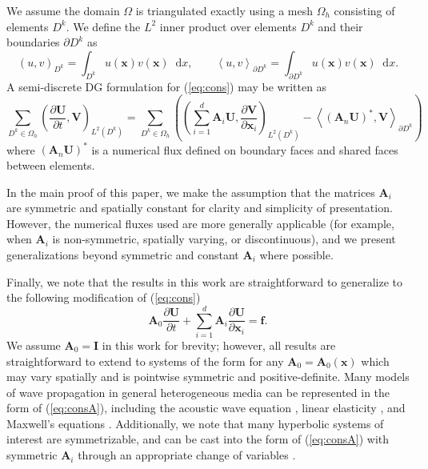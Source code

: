\documentclass[preprint,10pt]{elsarticle}
\newcommand{\pd}[2]{\frac{\partial#1}{\partial#2}}
\newcommand{\LRp}[1]{\left( #1 \right)}
\newcommand{\LRa}[1]{\left\langle #1 \right\rangle}
\newcommand{\Lk}{L^2\LRp{D^k}}
\newcommand{\Oh}{\Omega_h}
\newcommand{\note}[1]{#1}
\newcommand*\diff[1]{\mathop{}\!{\mathrm{d}#1}}
\begin{document}
We assume the domain $\Omega$ is triangulated exactly using a mesh $\Oh$ consisting of elements $D^k$.  We define the $L^2$ inner product over elements $D^k$ and their boundaries $\partial D^k$ as
\[
\LRp{u,v}_{D^k} = \int_{D^k} u(\bm{x})v(\bm{x}) \diff x, \qquad \LRa{u,v}_{\partial D^k} = \int_{\partial D^k} u(\bm{x})v(\bm{x}) \diff x.
\]
A semi-discrete DG formulation for (\ref{eq:cons}) may be written as 
\begin{equation}
\sum_{D^k \in \Oh} \LRp{\pd{\bm{U}}{t},\bm{V} }_{\Lk} = \sum_{D^k \in \Oh}\LRp{ \note{\LRp{\sum_{i=1}^d\bm{A}_i \bm{U}, \pd{\bm{V}}{\bm{x}_i}}_{\Lk}} - \LRa{(\bm{A}_n\bm{U})^*,\bm{V}}_{\partial D^k}}
\label{eq:formulation}
\end{equation}
where $(\bm{A}_n\bm{U})^*$ is a numerical flux defined on boundary faces and shared faces between elements.  

\note{
In the main proof of this paper, we make the assumption that the matrices $\bm{A}_i$ are symmetric and spatially constant for clarity and simplicity of presentation.  However, the numerical fluxes used are more generally applicable (for example, when $\bm{A}_i$ is non-symmetric, spatially varying, or discontinuous), and we present generalizations beyond symmetric and constant $\bm{A}_i$ where possible.  
}

Finally, we note that
the results in this work are straightforward to generalize to the following modification of (\ref{eq:cons})
\begin{equation}
\bm{A}_0\pd{\bm{U}}{t} + \sum_{i=1}^d \bm{A}_i\pd{{\bm{U}}}{\bm{x}_i} = \bm{f}.
\label{eq:consA}
\end{equation}
We assume $\bm{A}_0 = \bm{I}$ in this work for brevity; however, all results are straightforward to extend to systems of the form for any $\bm{A}_0 = \bm{A}_0(\bm{x})$ which may vary spatially and is pointwise symmetric and positive-definite.  Many models of wave propagation in general heterogeneous media can be represented in the form of (\ref{eq:consA}), including the acoustic wave equation \cite{chan2016weight1}, linear elasticity \cite{de2008interior,wilcox2010high,ye2016discontinuous}, and Maxwell's equations \cite{hesthaven2002nodal,hesthaven2004high,grote2007interior,warburton2013low}.  %
\note{Additionally, we note that many hyperbolic systems of interest are symmetrizable, and can be cast into the form of (\ref{eq:consA}) with symmetric $\bm{A}_i$ through an appropriate change of variables \cite{kopriva2014energy}.  }
\end{document}
